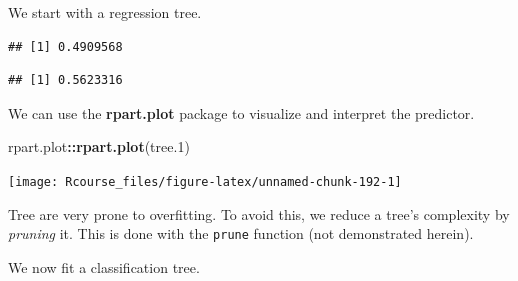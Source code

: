 \documentclass[]{book}
\newenvironment{Shaded}{\begin{snugshade}}{\end{snugshade}}
\newcommand{\KeywordTok}[1]{\textcolor[rgb]{0.13,0.29,0.53}{\textbf{#1}}}
\newcommand{\DataTypeTok}[1]{\textcolor[rgb]{0.13,0.29,0.53}{#1}}
\newcommand{\DecValTok}[1]{\textcolor[rgb]{0.00,0.00,0.81}{#1}}
\newcommand{\StringTok}[1]{\textcolor[rgb]{0.31,0.60,0.02}{#1}}
\newcommand{\CommentTok}[1]{\textcolor[rgb]{0.56,0.35,0.01}{\textit{#1}}}
\newcommand{\OperatorTok}[1]{\textcolor[rgb]{0.81,0.36,0.00}{\textbf{#1}}}
\newcommand{\NormalTok}[1]{#1}
\theoremstyle{definition}
\theoremstyle{definition}
\theoremstyle{definition}
\theoremstyle{remark}
\begin{document}
We start with a regression tree.

\begin{Shaded}
\end{Shaded}

\begin{verbatim}
## [1] 0.4909568
\end{verbatim}

\begin{Shaded}
\end{Shaded}

\begin{verbatim}
## [1] 0.5623316
\end{verbatim}

We can use the \textbf{rpart.plot} package to visualize and interpret
the predictor.

\begin{Shaded}
\begin{Highlighting}[]
\NormalTok{rpart.plot}\OperatorTok{::}\KeywordTok{rpart.plot}\NormalTok{(tree.}\DecValTok{1}\NormalTok{)}
\end{Highlighting}
\end{Shaded}

\texttt{[image: Rcourse\_files/figure-latex/unnamed-chunk-192-1]}

Tree are very prone to overfitting. To avoid this, we reduce a tree's
complexity by \emph{pruning} it. This is done with the \texttt{prune}
function (not demonstrated herein).

We now fit a classification tree.
\end{document}

